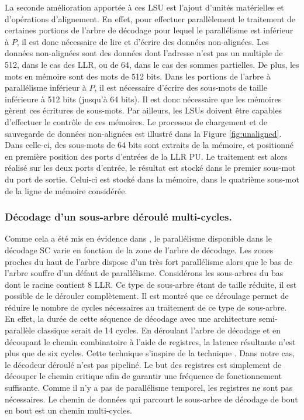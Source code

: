 La seconde amélioration apportée à ces LSU est l'ajout d'unités matérielles et d'opérations d'alignement. En effet, pour effectuer parallèlement le traitement de certaines portions de l'arbre de décodage pour lequel le parallélisme est inférieur à $P$, il est donc nécessaire de lire et d'écrire des données non-alignées. Les données non-alignées sont des données dont l'adresse n'est pas un multiple de 512, dans le cas des LLR, ou de 64, dans le cas des sommes partielles. De plus, les mots en mémoire sont des mots de 512 bits. Dans les portions de l'arbre à parallélisme inférieur à $P$, il est nécessaire d'écrire des sous-mots de taille inférieure à 512 bits (jusqu'à 64 bits). Il est donc nécessaire que les mémoires gèrent ces écritures de sous-mots. Par ailleurs, les LSUs doivent être capables d'effectuer le contrôle de ces mémoires. Le processus de chargement et de sauvegarde de données non-alignées est illustré dans la Figure \ref{fig:unaligned}. Dans celle-ci, des sous-mots de 64 bits sont extraits de la mémoire, et positionné en première position des ports d'entrées de la LLR PU. Le traitement est alors réalisé sur les deux ports d'entrée, le résultat est stocké dans le premier sous-mot du port de sortie. Celui-ci est stocké dans la mémoire, dans le quatrième sous-mot de la ligne de mémoire considérée.

\subsubsection{Décodage d'un sous-arbre déroulé multi-cycles.}

Comme cela a été mis en évidence dans \cite{gal_scalable_2016}, le parallélisme disponible dans le décodage SC varie en fonction de la zone de l'arbre de décodage. Les zones proches du haut de l'arbre dispose d'un très fort parallélisme alors que le bas de l'arbre souffre d'un défaut de parallélisme. Considérons les sous-arbres du bas dont le \noeud racine contient 8 LLR. Ce type de sous-arbre étant de taille réduite, il est possible de le dérouler complètement. Il est montré que ce déroulage permet de réduire le nombre de cycles nécessaires au traitement de ce type de sous-arbre. En effet, la durée de cette séquence de décodage avec une architecture semi-parallèle classique serait de 14 cycles. En déroulant l'arbre de décodage et en découpant le chemin combinatoire à l'aide de registres, la latence résultante n'est plus que de six cycles. Cette technique s'inspire de la technique \cite{giard_unrolled_2015}. Dans notre cas, le décodeur déroulé n'est pas pipeliné. Le but des registres est simplement de découper le chemin critique afin de garantir une fréquence de fonctionnement suffisante. Comme il n'y a pas de parallélisme temporel, les registres ne sont pas nécessaires. Le chemin de données qui parcourt le sous-arbre de décodage de bout en bout est un chemin multi-cycles.

